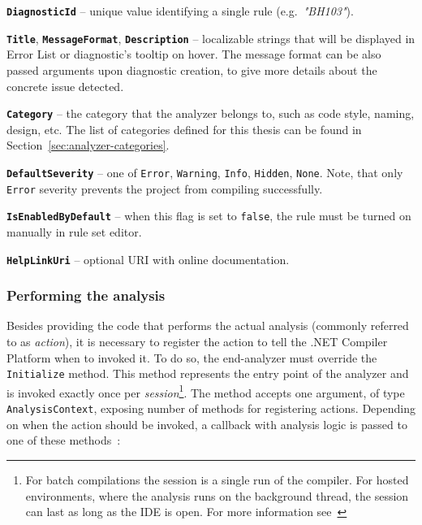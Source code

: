 \documentclass[
  digital, %
  table,   %
  lof,     %
  lot,     %
  oneside,
]{fithesis3}
\begin{document}
\smallskip
\begin{compactitem}
  \item[\texttt{\textbf{DiagnosticId}}] -- unique value identifying a single rule (e.g.~\textit{"BH103"}).
  \item[\texttt{\textbf{Title}}, \texttt{\textbf{MessageFormat}}, \texttt{\textbf{Description}}] -- localizable strings that will be displayed in Error List or diagnostic's tooltip on hover. The message format can be also passed arguments upon diagnostic creation, to give more details about the concrete issue detected.
  \item[\texttt{\textbf{Category}}] -- the category that the analyzer belongs to, such as code style, naming, design, etc. The list of categories defined for this thesis can be found in Section~\ref{sec:analyzer-categories}.
  \item[\texttt{\textbf{DefaultSeverity}}] -- one of \texttt{Error}, \texttt{Warning}, \texttt{Info}, \texttt{Hidden}, \texttt{None}. Note, that only \texttt{Error} severity prevents the project from compiling successfully.
  \item[\texttt{\textbf{IsEnabledByDefault}}] -- when this flag is set to \texttt{false}, the rule must be turned on manually in rule set editor.
  \item[\texttt{\textbf{HelpLinkUri}}] -- optional URI with online documentation.
\end{compactitem}

\subsubsection{Performing the analysis}
Besides providing the code that performs the actual analysis (commonly referred to as \textit{action}), it is necessary to register the action to tell the .NET Compiler Platform when to invoked it. To do so, the end-analyzer must override the \texttt{Initialize} method. This method represents the entry point of the analyzer and is invoked exactly once per \textit{session}\footnote{For batch compilations the session is a single run of the compiler. For hosted environments, where the analysis runs on the background thread, the session can last as long as the IDE is open. For more information see~\cite{analyzer-action-semantics}}. The method accepts one argument, of type \texttt{AnalysisContext}, exposing number of methods for registering actions. Depending on when the action should be invoked, a callback with analysis logic is passed to one of these methods~\cite{analyzer-action-semantics}:
\end{document}
